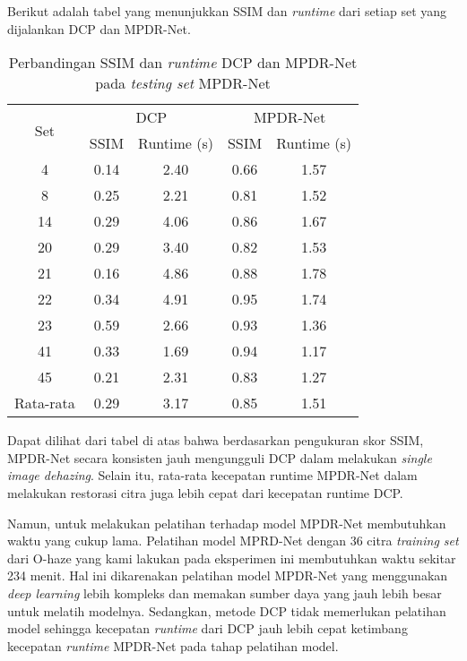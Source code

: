 \documentclass[11pt, a4paper, final]{report}
\begin{document}
Berikut adalah tabel yang menunjukkan SSIM dan \textit{runtime} dari setiap set yang dijalankan DCP dan MPDR-Net.

\begin{table}[H]
    \centering
    \begin{tabular}{ccccc}
    \hline
        \multirow{2}{*}{Set} & \multicolumn{2}{c}{DCP} & \multicolumn{2}{c}{MPDR-Net} \\\cline{2-5}
          & SSIM & Runtime (s) & SSIM & Runtime (s) \\\cline{1-5}
        4 & 0.14 & 2.40 & 0.66 & 1.57 \\
        8 & 0.25 & 2.21 & 0.81 & 1.52 \\
        14 & 0.29  & 4.06 & 0.86 & 1.67 \\
        20 & 0.29 & 3.40 & 0.82 & 1.53 \\
        21 & 0.16 & 4.86 & 0.88 & 1.78 \\
        22 & 0.34 & 4.91 & 0.95 & 1.74 \\
        23 & 0.59 & 2.66 & 0.93 & 1.36 \\
        41 & 0.33 & 1.69 & 0.94 & 1.17 \\
        45 & 0.21 & 2.31 & 0.83 & 1.27 \\
        \cline{1-5}
        Rata-rata & 0.29 & 3.17 & 0.85 & 1.51 \\
    \end{tabular}
    \caption{\label{tab:my_label}Perbandingan SSIM dan \textit{runtime} DCP dan MPDR-Net pada \textit{testing set} MPDR-Net}
\end{table}

Dapat dilihat dari tabel di atas bahwa berdasarkan pengukuran skor SSIM, MPDR-Net secara konsisten jauh mengungguli DCP dalam melakukan \textit{single image dehazing}. Selain itu, rata-rata kecepatan runtime MPDR-Net dalam melakukan restorasi citra juga lebih cepat dari kecepatan runtime DCP. \newline

Namun, untuk melakukan pelatihan terhadap model MPDR-Net membutuhkan waktu yang cukup lama. Pelatihan model MPRD-Net dengan 36 citra \textit{training set} dari O-haze yang kami lakukan pada eksperimen ini membutuhkan waktu sekitar 234 menit. Hal ini dikarenakan pelatihan model MPDR-Net yang menggunakan \textit{deep learning} lebih kompleks dan memakan sumber daya yang jauh lebih besar untuk melatih modelnya. Sedangkan, metode DCP tidak memerlukan pelatihan model sehingga kecepatan \textit{runtime} dari DCP jauh lebih cepat ketimbang kecepatan \textit{runtime} MPDR-Net pada tahap pelatihan model. \newline
\end{document}
